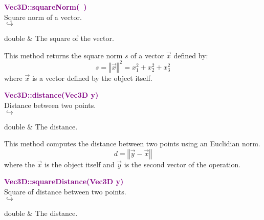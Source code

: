 \textcolor{purple}{\textbf{Vec3D::squareNorm(~)}}\label{Vec3D::squareNorm()}\\
Square norm of a vector.\\ \hspace*{5mm}$\hookrightarrow$
\vspace*{-2em}\begin{tcolorbox}[grow to left by=-1cm, width=\textwidth-1cm,myArgs,tabularx={l|R}]
double & The square of the vector.
\end{tcolorbox}

This method returns the square norm $s$ of a vector $\overrightarrow{x}$ defined by:
\begin{equation*}
s = \left\Vert \overrightarrow{x} \right\Vert^2  = {x_{1}^2 + x_{2}^2 + x_{3}^2}
\end{equation*}
where $\overrightarrow{x}$ is a vector defined by the object itself.

\textcolor{purple}{\textbf{Vec3D::distance(Vec3D y)}}\label{Vec3D::distance(Vec3D y)}\\
Distance between two points.\\ \hspace*{5mm}$\hookrightarrow$
\vspace*{-2em}\begin{tcolorbox}[grow to left by=-1cm, width=\textwidth-1cm,myArgs,tabularx={l|R}]
double & The distance.
\end{tcolorbox}

This method computes the distance between two points using an Euclidian norm.
\begin{equation*}
d = \left\Vert \overrightarrow{y} - \overrightarrow{x} \right\Vert
\end{equation*}
where the $\overrightarrow{x}$ is the object itself and $\overrightarrow{y}$ is the second vector of the operation.

\textcolor{purple}{\textbf{Vec3D::squareDistance(Vec3D y)}}\label{Vec3D::squareDistance(Vec3D y)}\\
Square of distance between two points.\\ \hspace*{5mm}$\hookrightarrow$
\vspace*{-2em}\begin{tcolorbox}[grow to left by=-1cm, width=\textwidth-1cm,myArgs,tabularx={l|R}]
double & The distance.
\end{tcolorbox}

